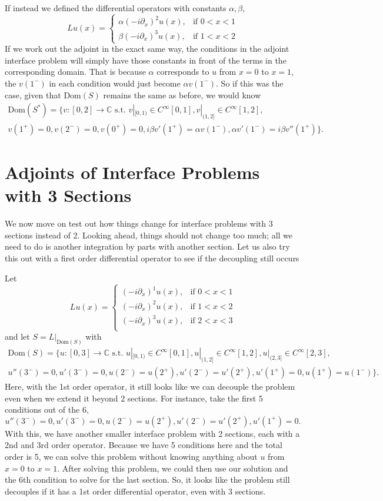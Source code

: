 \documentclass[11pt,reqno,oneside,a4paper]{article}
\begin{document}
If instead we defined the differential operators with constants $\alpha, \beta$,
\[
Lu(x)= 
\begin{cases}
\alpha(-i\partial_x)^2u(x),& \text{if } 0 < x < 1\\
\beta(-i\partial_x)^3u(x),& \text{if } 1 < x <2
\end{cases}
\]
If we work out the adjoint in the exact same way, the conditions in the adjoint interface problem will simply have those constants in front of the terms in the corresponding domain. That is because $\alpha$ corresponds to $u$ from $x=0$ to $x=1$, the $v(1^-)$ in each condition would just become $\alpha v(1^-)$. So if this was the case, given that Dom$(S)$ remains the same as before, we would know
\begin{multline*}
\text{Dom}(S^*) = \{v:[0,2] \to \mathbb{C} \text{ s.t. } v|_{[0,1)} \in C^\infty[0,1], v|_{(1,2]} \in C^\infty[1,2],\\ v(1^+) = 0, v(2^-) = 0, v(0^+) = 0, i\beta v'(1^+) = \alpha v(1^-), \alpha v'(1^-)=i \beta v''(1^+)\}.
\end{multline*}

\section*{Adjoints of Interface Problems with 3 Sections}
We now move on test out how things change for interface problems with 3 sections instead of 2. Looking ahead, things should not change too much; all we need to do is another integration by parts with another section. Let us also try this out with a first order differential operator to see if the decoupling still occurs

Let 
\[
Lu(x)= 
\begin{cases}
(-i\partial_x)^1u(x),& \text{if } 0 < x < 1\\
(-i\partial_x)^2u(x),& \text{if } 1 < x <2 \\
(-i\partial_x)^3u(x),& \text{if } 2 < x <3 \\
\end{cases}
\]
and let $S = L|_{\text{Dom}(S)}$ with
\begin{multline*}
\text{Dom}(S) = \{u:[0,3] \to \mathbb{C} \text{ s.t. } u|_{[0,1)} \in C^\infty[0,1], u|_{(1,2]} \in C^\infty[1,2], u|_{(2,3]} \in C^\infty[2,3], \\ u''(3^-) = 0, u'(3^-) = 0, u(2^-) = u(2^+),
u'(2^-) = u'(2^+), u'(1^+)=0, u(1^+)=u(1^-)\}.
\end{multline*} 
Here, with the 1st order operator, it still looks like we can decouple the problem even when we extend it beyond 2 sections. For instance, take the first 5 conditions out of the 6, $$u''(3^-) = 0, u'(3^-) = 0, u(2^-) = u(2^+),
u'(2^-) = u'(2^+), u'(1^+)=0.$$ 
With this, we have another smaller interface problem with 2 sections, each with a 2nd and 3rd order operator. Because we have 5 conditions here and the total order is 5, we can solve this problem without knowing anything about $u$ from $x=0$ to $x=1$. After solving this problem, we could then use our solution and the 6th condition to solve for the last section. So, it looks like the problem still decouples if it has a 1st order differential operator, even with 3 sections. 
\end{document}
